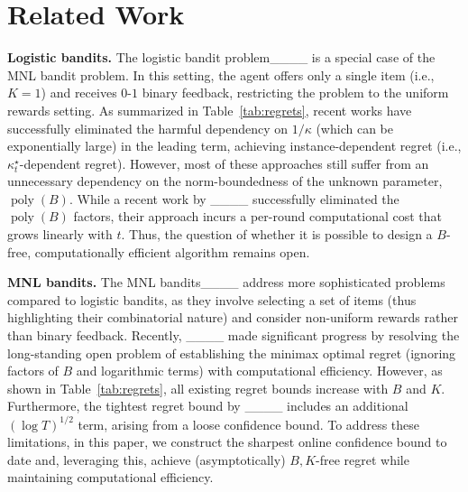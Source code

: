 \section{Related Work}
\label{sec:Related}
%
\textbf{Logistic bandits.}
%
The logistic bandit problem____ is a special case of the MNL bandit problem. 
In this setting, the agent offers only a single item (i.e., $K=1$) and receives $0$-$1$ binary feedback, restricting the problem to the uniform rewards setting.
As summarized in Table~\ref{tab:regrets}, recent works have successfully eliminated the harmful dependency on $1/\kappa$ (which can be exponentially large) in the leading term, achieving instance-dependent regret (i.e., 
 $\kappa^\star_t$-dependent regret). 
However, most of these approaches still suffer from an unnecessary dependency on the norm-boundedness of the unknown parameter, $\operatorname{poly}(B)$.
While a recent work by ____ successfully eliminated the $\operatorname{poly}(B)$ factors, their approach incurs a per-round computational cost that grows linearly with $t$.
Thus, the question of whether it is possible to design a $B$-free, computationally efficient algorithm remains open.


\textbf{MNL bandits.}
%
The MNL bandits____ address more sophisticated problems compared to logistic bandits, as they involve selecting a set of items (thus highlighting their combinatorial nature) and consider non-uniform rewards rather than binary feedback.
%
Recently, ____ made significant progress by resolving the long-standing open problem of establishing the minimax optimal regret (ignoring factors of $B$ and logarithmic terms) with computational efficiency. 
However, as shown in Table~\ref{tab:regrets}, all existing regret bounds increase with $B$ and $K$. 
Furthermore, the tightest regret bound by ____ includes an additional $(\log T)^{1/2}$ term, arising from a loose confidence bound.
%
To address these limitations, in this paper, we construct the sharpest online confidence bound to date and, leveraging this, achieve (asymptotically) $B,K$-free regret while maintaining computational efficiency.


